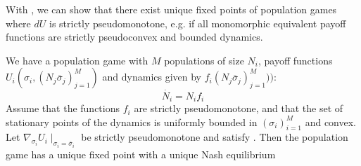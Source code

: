 With , we can show that there exist unique fixed points of population games where $dU$ is strictly pseudomonotone, e.g. if all monomorphic equivalent payoff functions are strictly pseudoconvex and bounded dynamics.
\begin{theorem}
  \label{thm:pop_game_exists_unique}
  We have a population game with $M$ populations of size $N_i$, payoff functions $U_i(\sigma_i, (N_j \overbar{\sigma}_j)_{j=1}^M)$ and dynamics given by $f_i(N_j \overbar{\sigma}_j)_{j=1}^M))$:
  \begin{equation}
    \dot{N_i} = N_i f_i
  \end{equation}
  Assume that the functions $f_i$ are strictly pseudomonotone, and that the set of stationary points of the dynamics is uniformly bounded in $(\sigma_i)_{i=1}^M$ and convex. Let $\nabla_{\sigma_i} U_i \mid_{\sigma_i = \overbar{\sigma}_i}$ be strictly pseudomonotone and satisfy . Then the population game has a unique fixed point with a unique Nash equilibrium
\end{theorem}
